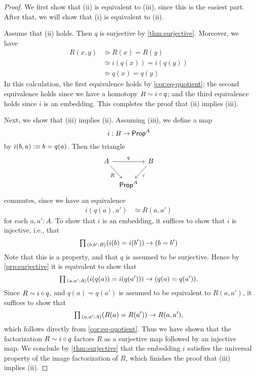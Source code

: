 \begin{proof}
  We first show that (ii) is equivalent to (iii), since this is the easiest part. After that, we will show that (i) is equivalent to (ii).

  Assume that (ii) holds. Then $q$ is surjective by \cref{thm:surjective}. Moreover, we have
  \begin{align*}
    R(x,y) & \simeq R(x)=R(y) \\
           & \simeq i(q(x))=i(q(y)) \\
           & \simeq q(x)=q(y)
  \end{align*}
  In this calculation, the first equivalence holds by \cref{cor:eq-quotient}; the second equivalence holds since we have a homotopy $R\sim i\circ q$; and the third equivalence holds since $i$ is an embedding. This completes the proof that (ii) implies (iii).

  Next, we show that (iii) implies (ii). Assuming (iii), we define a map
  \begin{equation*}
    i:B\to\mathsf{Prop}^A
  \end{equation*}
  by $i(b,a)\vcentcolon\equiv b=q(a)$. Then the triangle
  \begin{equation*}
    \begin{tikzcd}[column sep=tiny]
      A \arrow[rr,"q"] \arrow[dr,swap,"R"] & & B \arrow[dl,"i"] \\
      & \prop^A
    \end{tikzcd}
  \end{equation*}
  commutes, since we have an equivalence
  \begin{align*}
    i(q(a),a') & \simeq R(a,a')
  \end{align*}
  for each $a,a':A$. To show that $i$ is an embedding, it suffices to show that $i$ is injective, i.e., that
  \begin{equation*}
    \prd{b,b':B}(i(b)=i(b'))\to (b=b')
  \end{equation*}
  Note that this is a property, and that $q$ is assumed to be surjective. Hence by \cref{prp:surjective} it is equivalent to show that
  \begin{equation*}
    \prd{a,a':A}(i(q(a))=i(q(a')))\to (q(a)=q(a')).
  \end{equation*}
  Since $R\sim i\circ q$, and $q(a)=q(a')$ is assumed to be equivalent to $R(a,a')$, it suffices to show that
  \begin{equation*}
    \prd{a,a':A}(R(a)=R(a'))\to R(a,a'),
  \end{equation*}
  which follows directly from \cref{cor:eq-quotient}. Thus we have shown that the factorization $R\sim i\circ q$ factors $R$ as a surjective map followed by an injective map. We conclude by \cref{thm:surjective} that the embedding $i$ satisfies the universal property of the image factorization of $R$, which finishes the proof that (iii) implies (ii).
  

\end{proof}
